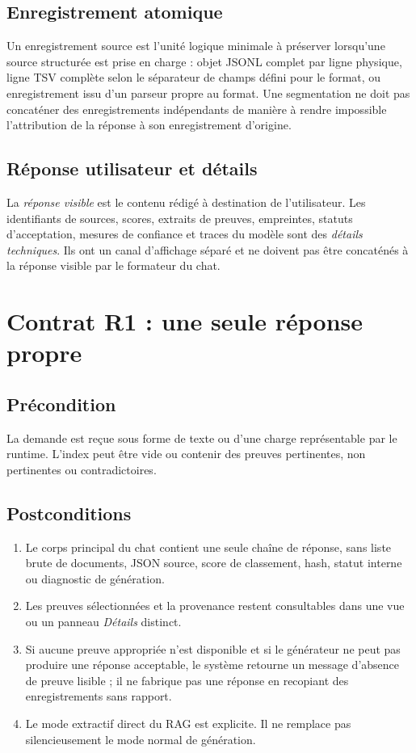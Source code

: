 \documentclass[11pt,a4paper]{article}
\begin{document}
\subsection{Enregistrement atomique}
Un enregistrement source est l'unité logique minimale à préserver lorsqu'une source structurée est prise en charge : objet JSONL complet par ligne physique, ligne TSV complète selon le séparateur de champs défini pour le format, ou enregistrement issu d'un parseur propre au format. Une segmentation ne doit pas concaténer des enregistrements indépendants de manière à rendre impossible l'attribution de la réponse à son enregistrement d'origine.

\subsection{Réponse utilisateur et détails}
La \emph{réponse visible} est le contenu rédigé à destination de l'utilisateur. Les identifiants de sources, scores, extraits de preuves, empreintes, statuts d'acceptation, mesures de confiance et traces du modèle sont des \emph{détails techniques}. Ils ont un canal d'affichage séparé et ne doivent pas être concaténés à la réponse visible par le formateur du chat.

\section{Contrat R1 : une seule réponse propre}
\subsection{Précondition}
La demande est reçue sous forme de texte ou d'une charge représentable par le runtime. L'index peut être vide ou contenir des preuves pertinentes, non pertinentes ou contradictoires.

\subsection{Postconditions}
\begin{enumerate}
\item Le corps principal du chat contient une seule chaîne de réponse, sans liste brute de documents, JSON source, score de classement, hash, statut interne ou diagnostic de génération.
\item Les preuves sélectionnées et la provenance restent consultables dans une vue ou un panneau \emph{Détails} distinct.
\item Si aucune preuve appropriée n'est disponible et si le générateur ne peut pas produire une réponse acceptable, le système retourne un message d'absence de preuve lisible ; il ne fabrique pas une réponse en recopiant des enregistrements sans rapport.
\item Le mode extractif direct du RAG est explicite. Il ne remplace pas silencieusement le mode normal de génération.
\end{enumerate}
\end{document}
